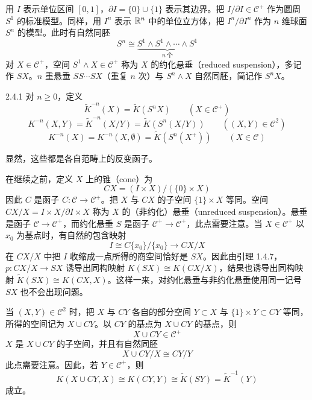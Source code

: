 用 $I$ 表示单位区间 $[0,1]$，$\partial I=\{0\}\cup\{1\}$ 表示其边界。把 $I/\partial I\in\mathcal{C}^+$ 作为圆周 $S^1$ 的标准模型。同样，用 $I^n$ 表示 $\mathbb{R}^n$ 中的单位立方体，把 $I^n/\partial I^n$ 作为 $n$ 维球面 $S^n$ 的模型。此时有自然同胚
\[
S^n\cong\underbrace{S^1\wedge S^1\wedge\cdots\wedge S^1}_{n\ \text{个}}
\]
对 $X\in\mathcal{C}^+$，空间 $S^1\wedge X\in\mathcal{C}^+$ 称为 $X$ 的约化悬垂（reduced suspension），多记作 $SX$。$n$ 重悬垂 $SS\cdots SX$（重复 $n$ 次）与 $S^n\wedge X$ 自然同胚，简记作 $S^nX$。

\begin{definition}{2.4.1}
  对 $n\ge0$，定义
  \[
  \tilde K^{-n}(X)=\tilde K(S^nX)\qquad(X\in\mathcal{C}^+)
  \]
  \[
  K^{-n}(X,Y)=\tilde K^{-n}(X/Y)=\tilde K(S^n(X/Y))\qquad((X,Y)\in\mathcal{C}^2)
  \]
  \[
  K^{-n}(X)=K^{-n}(X,\emptyset)=\tilde K(S^n(X^+))\qquad(X\in\mathcal{C})
  \]
\end{definition}


显然，这些都是各自范畴上的反变函子。

在继续之前，定义 $X$ 上的锥（cone）为
\[
CX=(I\times X)/(\{0\}\times X)
\]
因此 $C$ 是函子 $C\colon\mathcal{C}\to\mathcal{C}^+$。把 $X$ 与 $CX$ 的子空间 $\{1\}\times X$ 等同。空间 $CX/X=I\times X/\partial I\times X$ 称为 $X$ 的（非约化）悬垂（unreduced suspension）。悬垂是函子 $\mathcal{C}\to\mathcal{C}^+$，而约化悬垂 $S$ 是函子 $\mathcal{C}^+\to\mathcal{C}^+$，此点需要注意。当 $X\in\mathcal{C}^+$ 以 $x_0$ 为基点时，有自然的包含映射
\[
I\cong C\{x_0\}/\{x_0\}\longrightarrow CX/X
\]
在 $CX/X$ 中把 $I$ 收缩成一点所得的商空间恰好是 $SX$。因此由引理 1.4.7，$p\colon CX/X\to SX$ 诱导出同构映射 $K(SX)\cong K(CX/X)$，结果也诱导出同构映射 $\tilde K(SX)\cong K(CX,X)$。这样一来，对约化悬垂与非约化悬垂使用同一记号 $SX$ 也不会出现问题。


当 $(X,Y)\in\mathcal{C}^2$ 时，把 $X$ 与 $CY$ 各自的部分空间 $Y\subset X$ 与 $\{1\}\times Y\subset CY$ 等同，所得的空间记为 $X\cup CY$。以 $CY$ 的基点为 $X\cup CY$ 的基点，则
\[
X\cup CY\in\mathcal{C}^+
\]
$X$ 是 $X\cup CY$ 的子空间，并且有自然同胚
\[
X\cup CY/X\cong CY/Y
\]
此点需要注意。因此，若 $Y\in\mathcal{C}^+$，则
\[
K(X\cup CY,X)\cong K(CY,Y)\cong\tilde K(SY)=\tilde K^{-1}(Y)
\]
成立。

